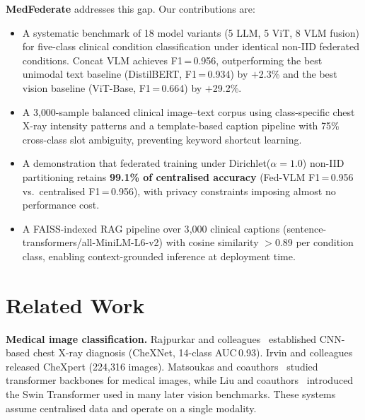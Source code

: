 \documentclass[conference]{IEEEtran}
\begin{document}
\textbf{MedFederate} addresses this gap. Our contributions are:
\begin{itemize}
  \item A systematic benchmark of 18 model variants (5 LLM, 5 ViT, 8 VLM
        fusion) for five-class clinical condition classification under
        identical non-IID federated conditions. Concat VLM achieves
        F1\,=\,0.956, outperforming the best unimodal text baseline
        (DistilBERT, F1\,=\,0.934) by $+$2.3\% and the best vision
        baseline (ViT-Base, F1\,=\,0.664) by $+$29.2\%.

  \item A 3{,}000-sample balanced clinical image--text corpus using
        class-specific chest X-ray intensity patterns and a
        template-based caption pipeline with 75\% cross-class slot
        ambiguity, preventing keyword shortcut learning.

  \item A demonstration that federated training under
        Dirichlet($\alpha{=}1.0$) non-IID partitioning retains
        \textbf{99.1\% of centralised accuracy} (Fed-VLM
        F1\,=\,0.956 vs.\ centralised F1\,=\,0.956), with
        privacy constraints imposing almost no performance cost.

  \item A FAISS-indexed RAG pipeline over 3{,}000 clinical captions
        (sentence-transformers/all-MiniLM-L6-v2) with cosine
        similarity $>$0.89 per condition class, enabling
        context-grounded inference at deployment time.
\end{itemize}

\section{Related Work}

\textbf{Medical image classification.}
Rajpurkar and colleagues~\cite{Rajpurkar2017} established CNN-based
chest X-ray diagnosis (CheXNet, 14-class AUC\,0.93).
Irvin and colleagues~\cite{Irvin2019} released CheXpert
(224{,}316 images). Matsoukas and coauthors~\cite{Matsoukas2021}
studied transformer backbones for medical images, while Liu and
coauthors~\cite{Liu2021swin} introduced the Swin Transformer used in
many later vision benchmarks. These systems assume centralised data and
operate on a single modality.
\end{document}
